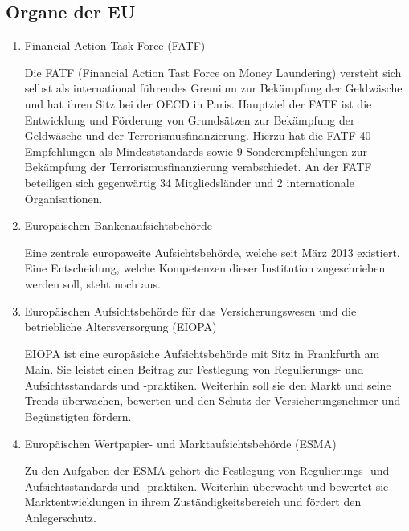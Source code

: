 \documentclass{article}
\begin{document}
        \subsection[Organe EU]{Organe der EU}

            \begin{enumerate}

                \item Financial Action Task Force (FATF)

                    Die FATF (Financial Action Tast Force on Money Laundering) versteht sich selbst als international führendes Gremium zur Bekämpfung der Geldwäsche und hat ihren Sitz bei der OECD in Paris. Hauptziel der FATF ist die Entwicklung und Förderung von Grundsätzen zur Bekämpfung der Geldwäsche und der Terrorismusfinanzierung. Hierzu hat die FATF 40 Empfehlungen als Mindeststandards sowie 9 Sonderempfehlungen zur Bekämpfung der Terrorismusfinanzierung verabschiedet. An der FATF beteiligen sich gegenwärtig 34 Mitgliedsländer und 2 internationale Organisationen.

                \item Europäischen Bankenaufsichtsbehörde

                    Eine zentrale europaweite Aufsichtsbehörde, welche seit März 2013 existiert. Eine Entscheidung, welche Kompetenzen dieser Institution zugeschrieben werden soll, steht noch aus. \cite{EuBaAuf}

                \item Europäischen Aufsichtsbehörde für das Versicherungswesen und die betriebliche Altersversorgung (EIOPA)

                    EIOPA ist eine europäsiche Aufsichtsbehörde mit Sitz in Frankfurth am Main. Sie leistet einen Beitrag zur Festlegung von Regulierungs- und Aufsichtsstandards und -praktiken. Weiterhin soll sie den Markt und seine Trends überwachen, bewerten und den Schutz der Versicherungsnehmer und Begünstigten fördern. \cite{EuVeAu}

\newpage

                \item Europäischen Wertpapier- und Marktaufsichtsbehörde (ESMA)

                    Zu den Aufgaben der ESMA gehört die Festlegung von Regulierungs- und Aufsichtsstandards und -praktiken. Weiterhin überwacht und bewertet sie Marktentwicklungen in ihrem Zuständigkeitsbereich und fördert den Anlegerschutz. \cite{EuWeAu}

            \end{enumerate}        
\end{document}
